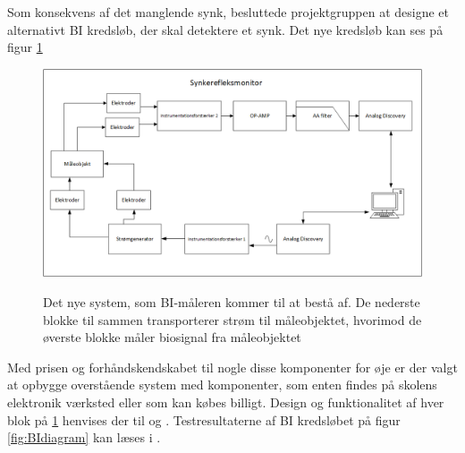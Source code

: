 Som konsekvens af det manglende synk, besluttede projektgruppen at designe et alternativt BI kredsløb, der skal detektere et synk. Det nye kredsløb kan ses på figur \ref{fig:konklusiondiagram}

\begin{figure}[H]
\centering
{\includegraphics[width=\linewidth]
{Figure/konklusiondiagram}}
\caption{Det nye system, som BI-måleren kommer til at bestå af. De nederste blokke til sammen transporterer strøm til måleobjektet, hvorimod de øverste blokke måler biosignal fra måleobjektet }
\label{fig:konklusiondiagram}
\end{figure} 

Med prisen og forhåndskendskabet til nogle disse komponenter for øje er der valgt at opbygge overstående system  med komponenter, som enten findes på skolens elektronik værksted eller som kan købes billigt. Design og funktionalitet af hver blok på \ref{fig:konklusiondiagram} henvises der til  og . Testresultaterne af BI kredsløbet på figur \ref{fig:BIdiagram} kan læses i   . 